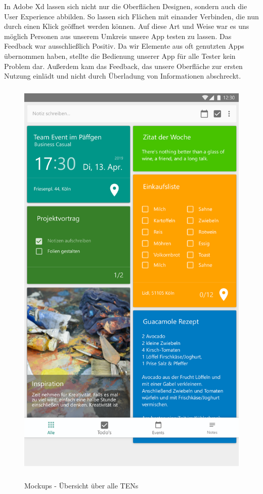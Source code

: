 In Adobe Xd lassen sich nicht nur die Oberflächen Designen, sondern auch die User Experience abbilden. So lassen sich Flächen mit einander Verbinden, die nun durch einen Klick geöffnet werden können. Auf diese Art und Weise war es uns möglich Personen aus unserem Umkreis unsere App testen zu lassen. Das Feedback war ausschließlich Positiv. Da wir Elemente aus oft genutzten Apps übernommen haben, stellte die Bedienung unserer App für alle Tester kein Problem dar. Außerdem kam das Feedback, das unsere Oberfläche zur ersten Nutzung einlädt und nicht durch Überladung von Informationen abschreckt.

\begin{figure}[H]
\centering
\begin{minipage}[t]{1\textwidth} %
\caption{Mockups - Übersicht über alle TENs} %
\includegraphics[height=20cm]{img/OverviewActivity}\\ %
\end{minipage}
\end{figure}

